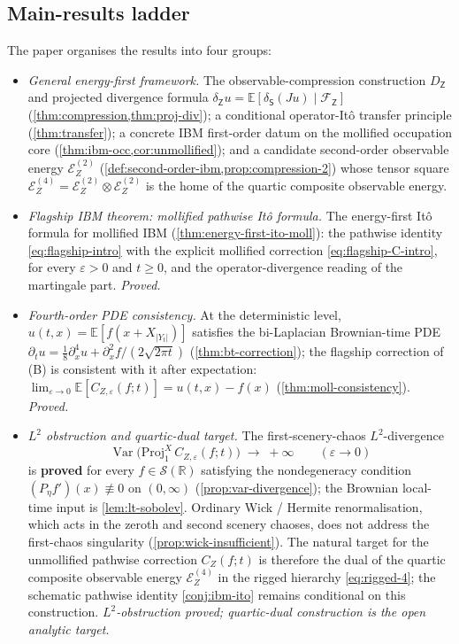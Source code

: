 \documentclass[11pt,reqno]{amsart}
\theoremstyle{plain}
\theoremstyle{definition}
\theoremstyle{remark}
\newcommand{\R}{\mathbb{R}}
\newcommand{\E}{\mathbb{E}}
\newcommand{\Energy}{\mathcal{E}}
\newcommand{\Source}{\mathsf{S}}
\newcommand{\Obs}{\mathsf{Z}}
\newcommand{\IBM}{Z}
\DeclareMathOperator{\Var}{Var}
\begin{document}
\subsection*{Main-results ladder}
The paper organises the results into four groups:
\begin{itemize}
\item[\textbf{(A)}] \emph{General energy-first framework.}
  The observable-compression construction $D_\Obs$ and projected
  divergence formula
  $\delta_\Obs u=\E[\delta_\Source(Ju)\mid\mathcal F_\Obs]$
  (\cref{thm:compression,thm:proj-div}); a conditional operator-It\^o
  transfer principle (\cref{thm:transfer}); a concrete IBM first-order
  datum on the mollified occupation core
  (\cref{thm:ibm-occ,cor:unmollified}); and a candidate second-order
  observable energy $\Energy_\IBM^{(2)}$
  (\cref{def:second-order-ibm,prop:compression-2}) whose
  tensor square $\Energy_\IBM^{(4)}=
  \Energy_\IBM^{(2)}\otimes\Energy_\IBM^{(2)}$ is the home of the
  quartic composite observable energy.
\item[\textbf{(B)}] \emph{Flagship IBM theorem: mollified pathwise
  It\^o formula.} The energy-first It\^o formula for mollified IBM
  (\cref{thm:energy-first-ito-moll}): the pathwise identity
  \eqref{eq:flagship-intro} with the explicit mollified correction
  \eqref{eq:flagship-C-intro}, for every $\varepsilon>0$ and
  $t\ge 0$, and the operator-divergence reading of the martingale
  part. \emph{Proved.}
\item[\textbf{(C)}] \emph{Fourth-order PDE consistency.}
  At the deterministic level, $u(t,x)=\E[f(x+X_{|Y_t|})]$ satisfies
  the bi-Laplacian Brownian-time PDE
  $\partial_t u=\tfrac18\partial_x^{4}u+\partial_x^{2}f/(2\sqrt{2\pi t})$
  (\cref{thm:bt-correction}); the flagship correction of (B) is
  consistent with it after expectation:
  $\lim_{\varepsilon\to 0}\E[C_{\IBM,\varepsilon}(f;t)]=u(t,x)-f(x)$
  (\cref{thm:moll-consistency}). \emph{Proved.}
\item[\textbf{(D)}] \emph{$L^{2}$ obstruction and quartic-dual
  target.} The first-scenery-chaos $L^{2}$-divergence
  \[
    \Var\bigl(\mathrm{Proj}_1^{X}\,C_{\IBM,\varepsilon}(f;t)\bigr)
     \;\to\;+\infty\qquad(\varepsilon\to 0)
  \]
  is \textbf{proved} for every $f\in\mathscr S(\R)$ satisfying the
  nondegeneracy condition $(P_\eta f')(x)\not\equiv 0$ on
  $(0,\infty)$ (\cref{prop:var-divergence}); the Brownian local-time
  input is \cref{lem:lt-sobolev}. Ordinary Wick / Hermite
  renormalisation, which acts in the zeroth and second scenery
  chaoses, does not address the first-chaos singularity
  (\cref{prop:wick-insufficient}). The natural target for the
  unmollified pathwise correction $C_\IBM(f;t)$ is therefore the
  dual of the quartic composite observable energy
  $\Energy_\IBM^{(4)}$ in the rigged hierarchy
  \eqref{eq:rigged-4}; the schematic pathwise identity
  \cref{conj:ibm-ito} remains conditional on this construction.
  \emph{$L^{2}$-obstruction proved; quartic-dual construction is the
  open analytic target.}
\end{itemize}
\end{document}
